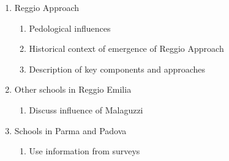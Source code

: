 \begin{enumerate}
	\item Reggio Approach
		\begin{enumerate}
			\item Pedological influences
			\item Historical context of emergence of Reggio Approach
			\item Description of key components and approaches
		\end{enumerate}
	\item Other schools in Reggio Emilia
		\begin{enumerate}
			\item Discuss influence of Malaguzzi
		\end{enumerate}
	\item Schools in Parma and Padova 
		\begin{enumerate}
			\item Use information from surveys
		\end{enumerate}	
\end{enumerate}

